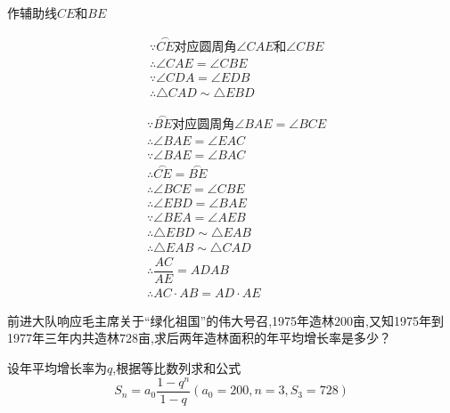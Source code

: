 \begin{questions}
\begin{figure*}[htbp]
\begin{tikzpicture}
		\end{tikzpicture}
	\end{figure*}
	\begin{proofsolution}
		\begin{cenum}
			\item 作辅助线$CE$和$BE$
			\item
			      \begin{align*}
				       & \because \overset{\frown}{CE}\text{对应圆周角}\angle{CAE}\text{和}\angle{CBE} \\
				       & \therefore \angle{CAE} = \angle{CBE}                                    \\
				       & \because \angle{CDA} = \angle{EDB}                                      \\
				       & \therefore \triangle{CAD} \sim \triangle{EBD}
			      \end{align*}
			\item
			      \begin{align*}
				       & \because\overset{\frown}{BE}对应圆周角\angle{BAE} = \angle{BCE} \\
				       & \therefore\angle{BAE} = \angle{EAC}                        \\
				       & \because \angle{BAE} = \angle{BAC}                         \\
				       & \therefore\overset{\frown}{CE} = \overset{\frown}{BE}      \\
				       & \therefore\angle{BCE} = \angle{CBE}                        \\
				       & \therefore\angle{EBD} = \angle{BAE}                        \\
				       & \because\angle{BEA} = \angle{AEB}                          \\
				       & \therefore\triangle{EBD} \sim \triangle{EAB}               \\
				       & \therefore\triangle{EAB} \sim \triangle{CAD}               \\
				       & \therefore\dfrac{AC}{AE}={AD}{AB}                          \\
				       & \therefore AC\cdot AB = AD\cdot AE
			      \end{align*}
		\end{cenum}
	\end{proofsolution}
	\question[8]
	前进大队响应毛主席关于\enquote{绿化祖国}的伟大号召,1975年造林$200$亩,又知1975年到1977年三年内共造林$728$亩,求后两年造林面积的年平均增长率是多少？
	\begin{solution}
		设年平均增长率为$q$,根据等比数列求和公式
		\begin{equation*}
			S_n = a_0\frac{1-q^n}{1-q} (a_0 = 200, n = 3, S_3 = 728)
		\end{equation*}


\end{solution}
\end{questions}
